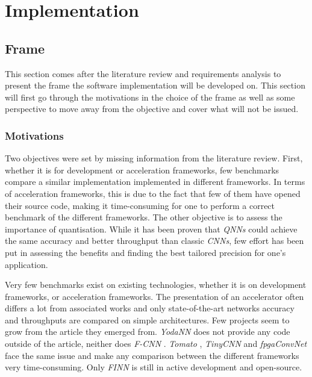 \chapter{Implementation} %

\label{Chapter6} %



\section{Frame}

This section comes after the literature review and requirements analysis to present the frame the software implementation will be developed on. This section will first go through the motivations in the choice of the frame as well as some perspective to move away from the objective and cover what will not be issued.


\subsection{Motivations}

Two objectives were set by missing information from the literature review. First, whether it is for development or acceleration frameworks, few benchmarks compare a similar implementation implemented in different frameworks. In terms of acceleration frameworks, this is due to the fact that few of them have opened their source code, making it time-consuming for one to perform a correct benchmark of the different frameworks. The other objective is to assess the importance of quantisation. While it has been proven that \emph{QNNs} could achieve the same accuracy and better throughput than classic \emph{CNNs}, few effort has been put in assessing the benefits and finding the best tailored precision for one's application.

Very few benchmarks exist on existing technologies, whether it is on development frameworks, or acceleration frameworks. The presentation of an accelerator often differs a lot from associated works and only state-of-the-art networks accuracy and throughputs are compared on simple architectures. Few projects seem to grow from the article they emerged from. \emph{YodaNN} \cite{Andri2016} does not provide any code outside of the article, neither does \emph{F-CNN} \cite{Zhao2016}. \emph{Tomato} \cite{Zhao2019}, \emph{TinyCNN} \cite{Jahanshahi2019} and \emph{fpgaConvNet} \cite{Venieris2017} face the same issue and make any comparison between the different frameworks very time-consuming. Only \emph{FINN} \cite{Umuroglu2017a, Blott2018} is still in active development and open-source.


